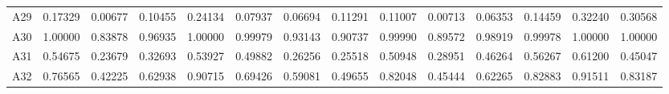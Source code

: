 \begin{tabular}{cccccccccccccc}
 A29   &  0.17329 &  0.00677 &  0.10455 &  0.24134 &  0.07937 &  0.06694 &  0.11291 &  0.11007 &  0.00713 &  0.06353 &  0.14459 &  0.32240 &  0.30568\\ 
 A30   &  1.00000 &  0.83878 &  0.96935 &  1.00000 &  0.99979 &  0.93143 &  0.90737 &  0.99990 &  0.89572 &  0.98919 &  0.99978 &  1.00000 &  1.00000\\ 
 A31   &  0.54675 &  0.23679 &  0.32693 &  0.53927 &  0.49882 &  0.26256 &  0.25518 &  0.50948 &  0.28951 &  0.46264 &  0.56267 &  0.61200 &  0.45047\\ 
 A32   &  0.76565 &  0.42225 &  0.62938 &  0.90715 &  0.69426 &  0.59081 &  0.49655 &  0.82048 &  0.45444 &  0.62265 &  0.82883 &  0.91511 &  0.83187\\ 
\bottomrule
\end{tabular}